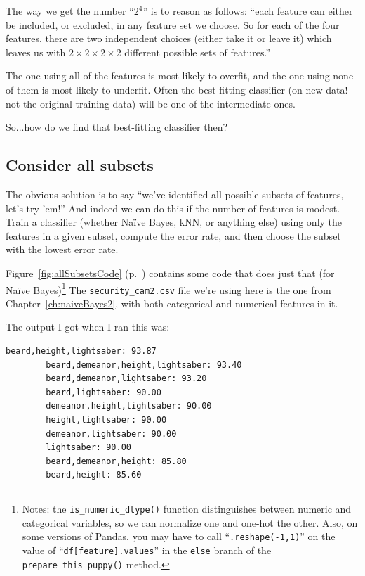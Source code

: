The way we get the number ``$2^4$'' is to reason as follows: ``each feature can
either be included, or excluded, in any feature set we choose. So for each of
the four features, there are two independent choices (either take it or leave
it) which leaves us with $2 \times 2 \times 2 \times 2$ different possible sets
of features.''

The one using all of the features is most likely to overfit, and the one using
none of them is most likely to underfit. Often the best-fitting classifier (on
new data! not the original training data) will be one of the intermediate
ones.

So...how do we find that best-fitting classifier then?

\subsection{Consider all subsets}

The obvious solution is to say ``we've identified all possible subsets of
features, let's try 'em!'' And indeed we can do this if the number of features
is modest. Train a classifier (whether Na\"{i}ve Bayes, kNN, or anything else)
using only the features in a given subset, compute the error rate, and then
choose the subset with the lowest error rate.

Figure~\ref{fig:allSubsetsCode} (p.~\pageref{fig:allSubsetsCode}) contains some
code that does just that (for Na\"{i}ve Bayes)\footnote{Notes: the
\texttt{is\_numeric\_dtype()} function distinguishes between numeric and
categorical variables, so we can normalize one and one-hot the other. Also, on
some versions of Pandas, you may have to call ``\texttt{.reshape(-1,1)}'' on
the value of ``\texttt{df[feature].values}'' in the \texttt{else} branch of the
\texttt{prepare\_this\_puppy()} method.} The \texttt{security\_cam2.csv} file
we're using here is the one from Chapter~\ref{ch:naiveBayes2}, with both
categorical and numerical features in it.

The output I got when I ran this was:

\begin{Verbatim}[fontsize=\small,samepage=true,frame=leftline,framesep=5mm,framerule=1mm]
        beard,height,lightsaber: 93.87
        beard,demeanor,height,lightsaber: 93.40
        beard,demeanor,lightsaber: 93.20
        beard,lightsaber: 90.00
        demeanor,height,lightsaber: 90.00
        height,lightsaber: 90.00
        demeanor,lightsaber: 90.00
        lightsaber: 90.00
        beard,demeanor,height: 85.80
        beard,height: 85.60
\end{Verbatim}

